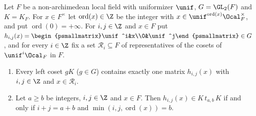 Let $F$ be a non-archimedean local field with uniformizer $\unif$, $G=\GL_2(F)$ and $K=K_F$. For $x\in F^\times$ let
$\operatorname{ord}(x)\in\Z$ be the integer with $x\in\unif^{\operatorname{ord}(x)}\Ocal_F^\times$, and put
$\operatorname{ord}(0)=+\infty$. For $i,j\in\Z$ and $x\in F$ put
$h_{i,j}(x)=\begin{psmallmatrix}\unif^i&x\\0&\unif^j\end{psmallmatrix}\in G$, and for every $i\in\Z$ fix a set
$\mathcal R_i\subseteq F$ of representatives of the cosets of $\unif^i\Ocal_F$ in $F$.
\begin{enumerate}[label=(\alph*)]
\item Every left coset $gK$ ($g\in G$) contains exactly one matrix $h_{i,j}(x)$ with $i,j\in\Z$ and $x\in\mathcal R_i$.
\item Let $a\ge b$ be integers, $i,j\in\Z$ and $x\in F$. Then $h_{i,j}(x)\in K\,t_{a,b}\,K$ if and only if $i+j=a+b$
  and $\min(i,j,\operatorname{ord}(x))=b$.
\end{enumerate}

